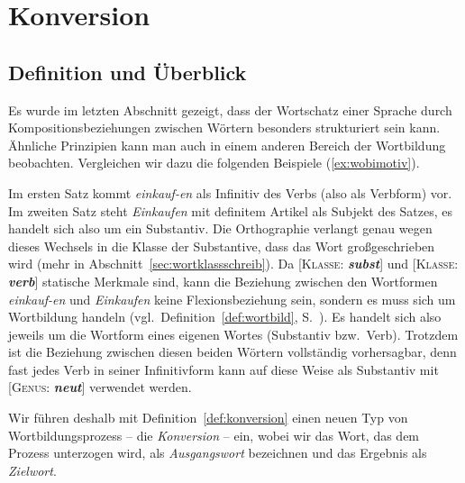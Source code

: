 \section{Konversion}

\label{sec:konv}

\subsection{Definition und Überblick}

\label{sec:konvdef}

Es wurde im letzten Abschnitt gezeigt, dass der Wortschatz einer Sprache durch Kompositionsbeziehungen zwischen Wörtern besonders strukturiert sein kann.
Ähnliche Prinzipien kann man auch in einem anderen Bereich der Wortbildung beobachten.
Vergleichen wir dazu die folgenden Beispiele (\ref{ex:wobimotiv}).

\begin{exe}
  \ex\label{ex:wobimotiv}
  \begin{xlist}
  \end{xlist}
\end{exe}

Im ersten Satz kommt \textit{einkauf-en} als Infinitiv des Verbs (also als Verbform) vor.
Im zweiten Satz steht \textit{Einkaufen} mit definitem Artikel als Subjekt des Satzes, es handelt sich also um ein Substantiv.
Die Orthographie verlangt genau wegen dieses Wechsels in die Klasse der Substantive, dass das Wort großgeschrieben wird (mehr in Abschnitt~\ref{sec:wortklassschreib}).
Da [\textsc{Klasse}: \textit{\textbf{subst}}] und [\textsc{Klasse}: \textit{\textbf{verb}}] statische Merkmale sind, kann die Beziehung zwischen den Wortformen \textit{einkauf-en} und \textit{Einkaufen} keine Flexionsbeziehung sein, sondern es muss sich um Wortbildung handeln (vgl.\ Definition~\ref{def:wortbild}, S.~\pageref{def:wortbild}).
Es handelt sich also jeweils um die Wortform eines eigenen Wortes (Substantiv bzw.\ Verb).
Trotzdem ist die Beziehung zwischen diesen beiden Wörtern vollständig vorhersagbar, denn fast jedes Verb in seiner Infinitivform kann auf diese Weise als Substantiv mit [\textsc{Genus}: \textit{\textbf{neut}}] verwendet werden.

Wir führen deshalb mit Definition~\ref{def:konversion} einen neuen Typ von Wortbildungsprozess -- die \textit{Konversion} -- ein, wobei wir das Wort, das dem Prozess unterzogen wird, als \textit{Ausgangswort} bezeichnen und das Ergebnis als \textit{Zielwort}.

